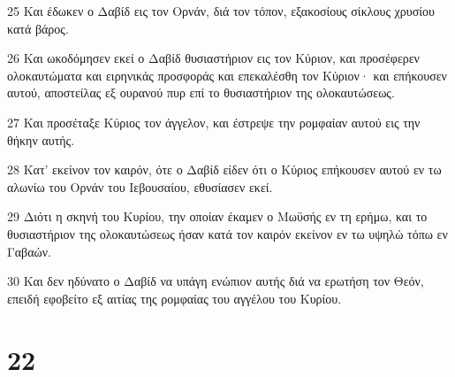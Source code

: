\par 25 Και έδωκεν ο Δαβίδ εις τον Ορνάν, διά τον τόπον, εξακοσίους σίκλους χρυσίου κατά βάρος.
\par 26 Και ωκοδόμησεν εκεί ο Δαβίδ θυσιαστήριον εις τον Κύριον, και προσέφερεν ολοκαυτώματα και ειρηνικάς προσφοράς και επεκαλέσθη τον Κύριον· και επήκουσεν αυτού, αποστείλας εξ ουρανού πυρ επί το θυσιαστήριον της ολοκαυτώσεως.
\par 27 Και προσέταξε Κύριος τον άγγελον, και έστρεψε την ρομφαίαν αυτού εις την θήκην αυτής.
\par 28 Κατ' εκείνον τον καιρόν, ότε ο Δαβίδ είδεν ότι ο Κύριος επήκουσεν αυτού εν τω αλωνίω του Ορνάν του Ιεβουσαίου, εθυσίασεν εκεί.
\par 29 Διότι η σκηνή του Κυρίου, την οποίαν έκαμεν ο Μωϋσής εν τη ερήμω, και το θυσιαστήριον της ολοκαυτώσεως ήσαν κατά τον καιρόν εκείνον εν τω υψηλώ τόπω εν Γαβαών.
\par 30 Και δεν ηδύνατο ο Δαβίδ να υπάγη ενώπιον αυτής διά να ερωτήση τον Θεόν, επειδή εφοβείτο εξ αιτίας της ρομφαίας του αγγέλου του Κυρίου.

\chapter{22}


